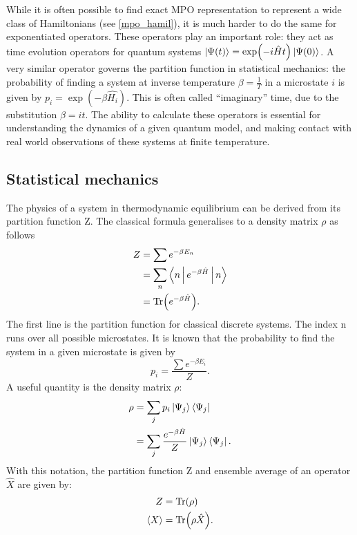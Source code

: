 
While it is often possible to find exact \Gls{MPO} representation to represent a wide class of Hamiltonians (see \cref{mpo_hamil}), it is much harder to do the same for exponentiated operators. These operators play an important role: they act as time evolution operators for quantum systems $ \ket{\Psi(t)} = \exp( -i \hat{H} t ) \ket{\Psi(0)}$. A very similar operator governs the partition function in statistical mechanics: the probability of finding a system at inverse temperature $\beta = \frac{1}{T}$ in a microstate $i$ is given by $p_i = \exp(  - \beta \hat{H_i} )$. This is often called “imaginary” time, due to the substitution $\beta = i t$. The ability to calculate these operators is essential for understanding the dynamics of a given quantum model, and making contact with real world observations of these systems at finite temperature.

\subsection{Statistical mechanics}\label{subsec:statmech}

The physics of a system in thermodynamic equilibrium can be derived from its partition function Z. The classical formula generalises to a density matrix $\rho$ as follows
\begin{equation}
  \begin{split}
    Z &= \sum e^{ - \beta E_n} \\
    &= \sum_n \Braket{n | e^{ - \beta \hat{H} }  | n} \\
    &= \Tr( e^{ - \beta \hat{H} } ).
  \end{split}
\end{equation}
The first line is the partition function for classical discrete systems. The index n runs over all possible microstates. It is known that the probability to find the system in a given microstate is given by
\begin{equation}
  p_i = \frac{\sum e^{ - \beta E_i}}{Z} .
\end{equation}
A useful quantity is the density matrix $\rho$:
\begin{equation}
  \begin{split}
    \rho &= \sum_j p_i  \Ket{ \Psi_j} \Bra{\Psi_j}   \\
    &= \sum_j \frac{ e^{ - \beta \hat{H} } }{Z}  \Ket{ \Psi_j} \Bra{\Psi_j} .
  \end{split}
\end{equation}
With this notation, the partition function Z and ensemble average of an operator $\hat{X}$ are given by:
\begin{equation}
  \begin{split}
    Z &= \Tr( \rho) \\
    \Braket{X} &= \Tr(\rho \hat{X}) .
  \end{split}
\end{equation}

